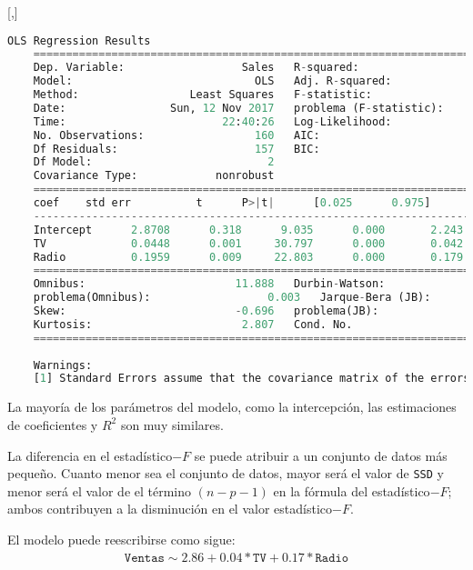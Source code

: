 [,]{}

\begin{lstlisting}[language=Python]
	OLS Regression Results
	==============================================================================
	Dep. Variable:                  Sales   R-squared:                       0.906
	Model:                            OLS   Adj. R-squared:                  0.904
	Method:                 Least Squares   F-statistic:                     753.7
	Date:                Sun, 12 Nov 2017   problema (F-statistic):           3.22e-81
	Time:                        22:40:26   Log-Likelihood:                -299.60
	No. Observations:                 160   AIC:                             605.2
	Df Residuals:                     157   BIC:                             614.4
	Df Model:                           2
	Covariance Type:            nonrobust
	==============================================================================
	coef    std err          t      P>|t|      [0.025      0.975]
	------------------------------------------------------------------------------
	Intercept      2.8708      0.318      9.035      0.000       2.243       3.498
	TV             0.0448      0.001     30.797      0.000       0.042       0.048
	Radio          0.1959      0.009     22.803      0.000       0.179       0.213
	==============================================================================
	Omnibus:                       11.888   Durbin-Watson:                   2.158
	problema(Omnibus):                  0.003   Jarque-Bera (JB):               13.175
	Skew:                          -0.696   problema(JB):                      0.00138
	Kurtosis:                       2.807   Cond. No.                         438.
	==============================================================================
	
	Warnings:
	[1] Standard Errors assume that the covariance matrix of the errors is correctly specified.
\end{lstlisting}


La mayoría de los parámetros del modelo, como la intercepción, las estimaciones de coeficientes y $R^2$ son
muy similares.


La diferencia en el estadístico$-F$ se puede atribuir a un conjunto de datos más pequeño. Cuanto menor sea el conjunto de datos, mayor será el valor de \texttt{SSD} y menor será el valor de
el término $(n-p-1)$ en la fórmula del estadístico$-F$; ambos contribuyen a la disminución en el valor estadístico$-F.$


El modelo puede reescribirse como sigue:
\begin{align}
	\texttt{Ventas} \sim 2.86 + 0.04*\texttt{TV} + 0.17*\texttt{Radio}
\end{align}

